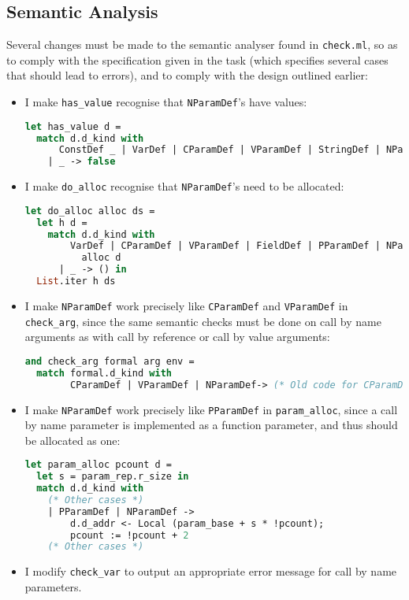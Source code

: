 \documentclass[a4paper,10pt]{article}
\begin{document}
\subsection{Semantic Analysis}
Several changes must be made to the semantic analyser found in \texttt{check.ml}, so as to comply with the specification given in the task (which specifies several cases that should lead to errors), and to comply with the design outlined earlier:
\begin{itemize}
    \item I make \texttt{has\_value} recognise that \texttt{NParamDef}'s have values:
        \begin{lstlisting}[language=ml]
let has_value d = 
  match d.d_kind with
      ConstDef _ | VarDef | CParamDef | VParamDef | StringDef | NParamDef-> true 
    | _ -> false
        \end{lstlisting}
    \item I make \texttt{do\_alloc} recognise that \texttt{NParamDef}'s need to be allocated:
        \begin{lstlisting}[language=ml]
let do_alloc alloc ds =
  let h d =
    match d.d_kind with
        VarDef | CParamDef | VParamDef | FieldDef | PParamDef | NParamDef->
          alloc d
      | _ -> () in
  List.iter h ds
        \end{lstlisting}
    \item I make \texttt{NParamDef} work precisely like \texttt{CParamDef} and \texttt{VParamDef} in \texttt{check\_arg}, since the same semantic checks must be done on call by name arguments as with call by reference or call by value arguments:
        \begin{lstlisting}[language=ml]
and check_arg formal arg env =
  match formal.d_kind with
        CParamDef | VParamDef | NParamDef-> (* Old code for CParamDef and VParamDef *)
        \end{lstlisting}
    \item I make \texttt{NParamDef} work precisely like \texttt{PParamDef} in \texttt{param\_alloc}, since a call by name parameter is implemented as a function parameter, and thus should be allocated as one:
        \begin{lstlisting}[language=ml]
let param_alloc pcount d =
  let s = param_rep.r_size in
  match d.d_kind with
    (* Other cases *)
    | PParamDef | NParamDef ->
        d.d_addr <- Local (param_base + s * !pcount);
        pcount := !pcount + 2
    (* Other cases *)
        \end{lstlisting}
    \item I modify \texttt{check\_var} to output an appropriate error message for call by name parameters.

\end{itemize}
\end{document}
